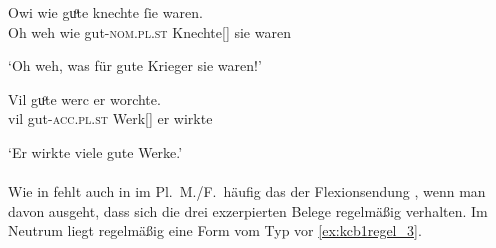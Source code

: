 \begin{exe}
\ex \label{ex:kchregel}
	\begin{xlist}
	\ex \label{ex:kchregel_1}
		\gll Owi wie guͦte knechte ſie waren. \\
			{Oh weh} wie gut-\textsc{nom.pl.st} Knechte[\MascM] sie waren \\
		\begin{taggedline}{\parencites[\pno~2\va, 37]{kc:H}[vgl.][311]{schroeder1895}}
		\trans `Oh weh, was für gute Krieger sie waren!'
		\end{taggedline}

	\ex \label{ex:kchregel_2}
		\gll Vil guͦte werc er worchte. \\
			vil gut-\textsc{acc.pl.st} Werk[\NeutI] er wirkte \\
		\begin{taggedline}{\parencites[\pno~79\va, 6]{kc:H}[vgl.][13072]{schroeder1895}}
		\trans `Er wirkte viele gute Werke.'
		\end{taggedline}
	\end{xlist}
\end{exe}

\paragraph{\citet{kc:B1}}
Wie in \citet{kc:M} fehlt auch in \citet{kc:B1} im Pl.\ M./F.\ häufig
das  der Flexionsendung ,
wenn man davon ausgeht, dass sich die drei exzerpierten Belege regelmäßig
verhalten. Im Neutrum liegt regelmäßig eine Form vom Typ  vor
\cref{ex:kcb1regel_3}.

